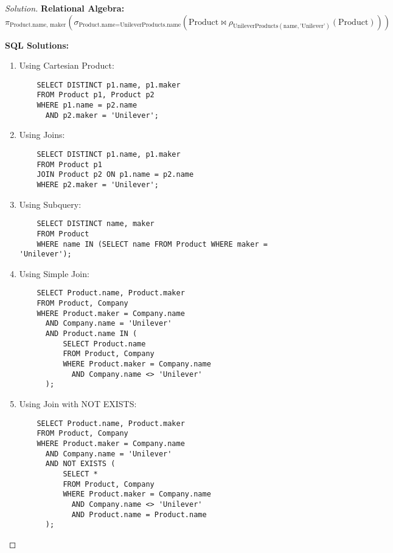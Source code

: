 \documentclass[10pt]{article}
\begin{document}
\begin{proof}[Solution]
\textbf{Relational Algebra:}
\[
\pi_{\text{Product.name, maker}}\left(\sigma_{\text{Product.name} = \text{UnileverProducts.name}}\left(\text{Product} \bowtie \rho_{\text{UnileverProducts}(\text{name}, \text{'Unilever'})}(\text{Product})\right)\right)
\]

\textbf{SQL Solutions:}
\begin{enumerate}
    \item Using Cartesian Product:
    \begin{verbatim}
    SELECT DISTINCT p1.name, p1.maker
    FROM Product p1, Product p2
    WHERE p1.name = p2.name
      AND p2.maker = 'Unilever';
    \end{verbatim}
    
    \item Using Joins:
    \begin{verbatim}
    SELECT DISTINCT p1.name, p1.maker
    FROM Product p1
    JOIN Product p2 ON p1.name = p2.name
    WHERE p2.maker = 'Unilever';
    \end{verbatim}
    
    \item Using Subquery:
    \begin{verbatim}
    SELECT DISTINCT name, maker
    FROM Product
    WHERE name IN (SELECT name FROM Product WHERE maker = 'Unilever');
    \end{verbatim}
     \item Using Simple Join:
    \begin{verbatim}
    SELECT Product.name, Product.maker
    FROM Product, Company
    WHERE Product.maker = Company.name
      AND Company.name = 'Unilever'
      AND Product.name IN (
          SELECT Product.name
          FROM Product, Company
          WHERE Product.maker = Company.name
            AND Company.name <> 'Unilever'
      );
    \end{verbatim}
    
    \item Using Join with NOT EXISTS:
    \begin{verbatim}
    SELECT Product.name, Product.maker
    FROM Product, Company
    WHERE Product.maker = Company.name
      AND Company.name = 'Unilever'
      AND NOT EXISTS (
          SELECT *
          FROM Product, Company
          WHERE Product.maker = Company.name
            AND Company.name <> 'Unilever'
            AND Product.name = Product.name
      );
    \end{verbatim}
\end{enumerate}
\end{proof}
\end{document}
